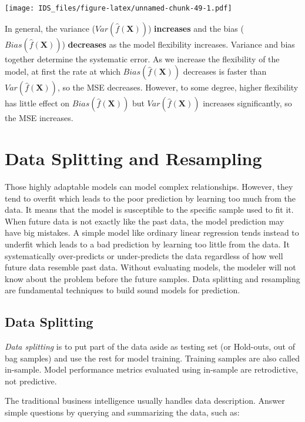 \documentclass[12pt,]{krantz}
\begin{document}
\texttt{[image: IDS\_files/figure-latex/unnamed-chunk-49-1.pdf]}

In general, the variance (\(Var(\hat{f}(\mathbf{X}))\)) \textbf{increases} and the bias (\(Bias(\hat{f}(\mathbf{X}))\)) \textbf{decreases} as the model flexibility increases. Variance and bias together determine the systematic error. As we increase the flexibility of the model, at first the rate at which \(Bias(\hat{f}(\mathbf{X}))\) decreases is faster than \(Var (\hat{f} (\mathbf{X}))\), so the MSE decreases. However, to some degree, higher flexibility has little effect on \(Bias(\hat{f}(\mathbf{X}))\) but \(Var(\hat{f} (\mathbf{X}))\) increases significantly, so the MSE increases.

\hypertarget{datasplittingresampling}{%
\section{Data Splitting and Resampling}\label{datasplittingresampling}}

Those highly adaptable models can model complex relationships. However, they tend to overfit which leads to the poor prediction by learning too much from the data. It means that the model is susceptible to the specific sample used to fit it. When future data is not exactly like the past data, the model prediction may have big mistakes. A simple model like ordinary linear regression tends instead to underfit which leads to a bad prediction by learning too little from the data. It systematically over-predicts or under-predicts the data regardless of how well future data resemble past data. Without evaluating models, the modeler will not know about the problem before the future samples. Data splitting and resampling are fundamental techniques to build sound models for prediction.

\hypertarget{datasplitting}{%
\subsection{Data Splitting}\label{datasplitting}}

\emph{Data splitting} is to put part of the data aside as testing set (or Hold-outs, out of bag samples) and use the rest for model training. Training samples are also called in-sample. Model performance metrics evaluated using in-sample are retrodictive, not predictive.

The traditional business intelligence usually handles data description. Answer simple questions by querying and summarizing the data, such as:
\end{document}
